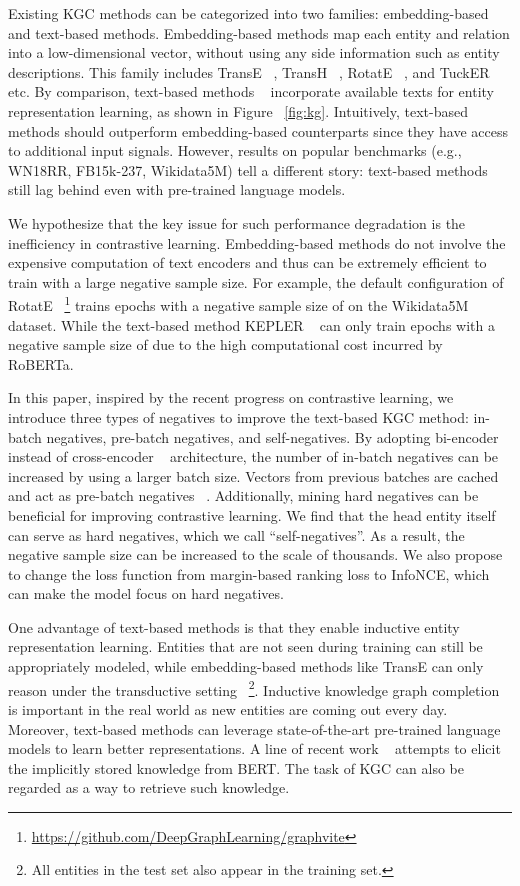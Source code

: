 \documentclass[11pt]{article}
\begin{document}
Existing KGC methods can be categorized into two families:
embedding-based and text-based methods.
Embedding-based methods map each entity and relation into a low-dimensional vector,
without using any side information such as entity descriptions.
This family includes TransE ~\citep{bordes2013translating}, TransH ~\citep{wang2014knowledge},
RotatE ~\citep{sun2018rotate}, and TuckER ~\citep{balazevic-etal-2019-tucker} etc.
By comparison,
text-based methods ~\citep{yao2019kg,xie2016representation,wang2021kepler}
incorporate available texts for entity representation learning,
as shown in Figure ~\ref{fig:kg}.
Intuitively,
text-based methods should outperform embedding-based counterparts
since they have access to additional input signals.
However,
results on popular benchmarks (e.g., WN18RR, FB15k-237, Wikidata5M)
tell a different story:
text-based methods still lag behind even with pre-trained language models.

We hypothesize that the key issue for such performance degradation
is the inefficiency in contrastive learning.
Embedding-based methods do not involve the expensive computation of text encoders
and thus can be extremely efficient to train with a large negative sample size.
For example,
the default configuration of RotatE ~\footnote{\url{https://github.com/DeepGraphLearning/graphvite}}
trains  epochs with a negative sample size of  on the Wikidata5M dataset.
While the text-based method KEPLER ~\citep{wang2021kepler}
can only train  epochs with a negative sample size of 
due to the high computational cost incurred by RoBERTa.

In this paper,
inspired by the recent progress on contrastive learning,
we introduce three types of negatives to improve the text-based KGC method:
in-batch negatives,
pre-batch negatives,
and self-negatives.
By adopting bi-encoder instead of cross-encoder ~\citep{yao2019kg} architecture,
the number of in-batch negatives can be increased by using a larger batch size.
Vectors from previous batches are cached and act as pre-batch negatives ~\citep{karpukhin-etal-2020-dense}.
Additionally,
mining hard negatives can be beneficial for improving contrastive learning.
We find that the head entity itself can serve as hard negatives,
which we call ``self-negatives''.
As a result,
the negative sample size can be increased to the scale of thousands.
We also propose to change the loss function from margin-based ranking loss to InfoNCE,
which can make the model focus on hard negatives.

One advantage of text-based methods is that
they enable inductive entity representation learning.
Entities that are not seen during training can still be appropriately modeled,
while embedding-based methods like TransE can only reason under the transductive setting
~\footnote{All entities in the test set also appear in the training set.}.
Inductive knowledge graph completion is important in the real world
as new entities are coming out every day.
Moreover,
text-based methods can leverage state-of-the-art pre-trained language models to learn better representations.
A line of recent work ~\citep{shin-etal-2020-autoprompt,petroni-etal-2019-language}
attempts to elicit the implicitly stored knowledge from BERT.
The task of KGC can also be regarded as a way to retrieve such knowledge.
\end{document}
